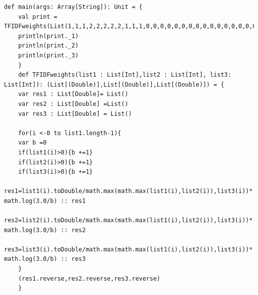 \documentclass{article}
\theoremstyle{remark}
\begin{document}
	\newpage
	\begin{lstlisting}[caption = Task C]
	def main(args: Array[String]): Unit = {
	val print = TFIDFweights(List(1,1,1,2,2,2,2,2,1,1,1,0,0,0,0,0,0,0,0,0,0,0,0,0,0,0,0,0,0,0,0),List(0,1,2,0,2,2,1,1,0,0,0,1,1,1,1,1,0,0,0,0,0,0,0,0,0,0,0,0,0,0,0),List(0,0,0,0,0,0,0,0,0,0,0,0,0,0,0,0,2,1,1,1,1,1,1,1,1,1,1,1,1,1,1))
	println(print._1)
	println(print._2)
	println(print._3)
	}
	def TFIDFweights(list1 : List[Int],list2 : List[Int], list3: List[Int]): (List[(Double)],List[(Double)],List[(Double)]) = {
	var res1 : List[Double]= List()
	var res2 : List[Double] =List()
	var res3 : List[Double] = List()
	
	for(i <-0 to list1.length-1){
	var b =0
	if(list1(i)>0){b +=1}
	if(list2(i)>0){b +=1}
	if(list3(i)>0){b +=1}
	res1=list1(i).toDouble/math.max(math.max(list1(i),list2(i)),list3(i))* math.log(3.0/b) :: res1
	res2=list2(i).toDouble/math.max(math.max(list1(i),list2(i)),list3(i))* math.log(3.0/b) :: res2
	res3=list3(i).toDouble/math.max(math.max(list1(i),list2(i)),list3(i))* math.log(3.0/b) :: res3
	}
	(res1.reverse,res2.reverse,res3.reverse)
	}
	\end{lstlisting}
	
\end{document}
